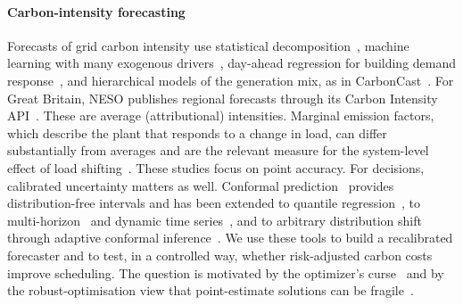 \paragraph{Carbon-intensity forecasting} Forecasts of grid carbon intensity use statistical decomposition~\cite{bokde2021short}, machine learning with many exogenous drivers~\cite{leerbeck2020short}, day-ahead regression for building demand response~\cite{lowry2018day}, and hierarchical models of the generation mix, as in CarbonCast~\cite{maji2022carboncast}. For Great Britain, NESO publishes regional forecasts through its Carbon Intensity API~\cite{nesoapi}. These are average (attributional) intensities. Marginal emission factors, which describe the plant that responds to a change in load, can differ substantially from averages and are the relevant measure for the system-level effect of load shifting~\cite{hawkes2010estimating,silerevans2012marginal}. These studies focus on point accuracy. For decisions, calibrated uncertainty matters as well. Conformal prediction~\cite{vovk2005algorithmic,lei2018distribution,angelopoulos2023conformal} provides distribution-free intervals and has been extended to quantile regression~\cite{romano2019conformalized}, to multi-horizon~\cite{stankeviciute2021conformal} and dynamic time series~\cite{xu2023conformal}, and to arbitrary distribution shift through adaptive conformal inference~\cite{gibbs2021adaptive}. We use these tools to build a recalibrated forecaster and to test, in a controlled way, whether risk-adjusted carbon costs improve scheduling. The question is motivated by the optimizer's curse~\cite{smith2006optimizer} and by the robust-optimisation view that point-estimate solutions can be fragile~\cite{bental2000robust,bertsimas2004price}.
